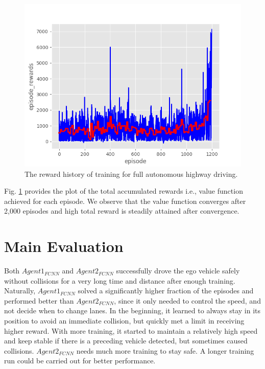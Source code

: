 \begin{figure}[h]
\centering
\includegraphics[width=1.0\textwidth]{figs/ch5/auto-reward}
\caption{The reward history of training for full autonomous highway driving.}
\label{fig:auto}
\end{figure}

Fig. \ref{fig:auto} provides the plot of the total accumulated rewards i.e., value function achieved for each episode. We observe that the value function converges after 2,000 episodes and high total reward is steadily attained after convergence.

\section{Main Evaluation}

Both $Agent1_{FCNN}$ and $Agent2_{FCNN}$ successfully drove the ego vehicle safely without collisions for a very long time and distance after enough training. Naturally, $Agent1_{FCNN}$ solved a significantly higher fraction of the episodes and performed better than $Agent2_{FCNN}$, since it only needed to control the speed, and not decide when to change lanes. In the beginning, it learned to always stay in its position to avoid an immediate collision, but quickly met a limit in receiving higher reward. With more training, it started to maintain a relatively high speed and keep stable if there is a preceding vehicle detected, but sometimes caused collisions. $Agent2_{FCNN}$ needs much more training to stay safe. A longer training run could be carried out for better performance.
